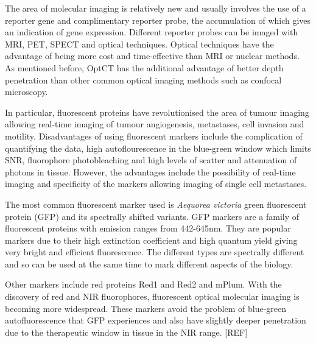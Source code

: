 \documentclass[12pt]{article}
\begin{document}

The area of molecular imaging is relatively new and usually involves the use of a reporter gene and complimentary reporter probe, the accumulation of which gives an indication of gene expression. \cite{Blasberg:2003} Different reporter probes can be imaged with MRI, PET, SPECT and optical techniques. Optical techniques have the advantage of being more cost and time-effective than MRI or nuclear methods. As mentioned before, OptCT has the additional advantage of better depth penetration than other common optical imaging methods such as confocal microscopy.

In particular, fluorescent proteins have revolutionised the area of tumour imaging allowing real-time imaging of tumour angiogenesis, metastases, cell invasion and motility. \cite{Hoffman:2005}
Disadvantages of using fluorescent markers include the complication of  quantifying the data, high autoflourescence in the blue-green window which limits SNR, fluorophore photobleaching and high levels of scatter and attenuation of photons in tissue. \cite{Gross:2005} However, the advantages include the possibility of real-time imaging and specificity of the markers  allowing imaging of single cell metastases. \cite{Hoffman:2005} 


The most common fluorescent marker used is \textit{Aequorea victoria} green fluorescent protein (GFP) and its spectrally shifted variants. 
GFP markers are a family of fluorescent proteins with emission ranges from 442-645nm. \cite{Hoffman:2005} They are popular markers due to their high extinction coefficient and high quantum yield giving very bright and efficient fluorescence. The different types are spectrally different and so can be used at the same time to mark different aspects of the biology. \cite{Hoffman:2005} 

Other markers include red proteins Red1 and Red2 and mPlum. \cite{Blasberg:2003} With the discovery of red and NIR fluorophores, fluorescent optical molecular imaging is becoming  more widespread. These markers avoid the problem of blue-green autofluorescence that GFP experiences and also have slightly deeper penetration due to the therapeutic window in tissue in the NIR range. [REF]
\end{document}
